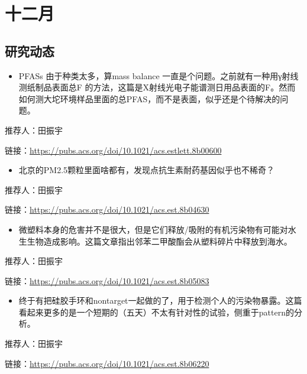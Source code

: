 \documentclass[
]{book}
\providecommand{\tightlist}{%
  \setlength{\itemsep}{0pt}\setlength{\parskip}{0pt}}
\begin{document}
\hypertarget{ux5341ux4e8cux6708-1}{%
\section*{十二月}\label{ux5341ux4e8cux6708-1}}

\hypertarget{ux7814ux7a76ux52a8ux6001-13}{%
\subsection*{研究动态}\label{ux7814ux7a76ux52a8ux6001-13}}

\begin{itemize}
\tightlist
\item
  PFASs 由于种类太多，算mass balance 一直是个问题。之前就有一种用γ射线测纸制品表面总F 的方法，这篇是X射线光电子能谱测日用品表面的F。然而如何测大坨环境样品里面的总PFAS，而不是表面，似乎还是个待解决的问题。
\end{itemize}

推荐人：田振宇

链接：\url{https://pubs.acs.org/doi/10.1021/acs.estlett.8b00600}

\begin{itemize}
\tightlist
\item
  北京的PM2.5颗粒里面啥都有，发现点抗生素耐药基因似乎也不稀奇？
\end{itemize}

推荐人：田振宇

链接：\url{https://pubs.acs.org/doi/10.1021/acs.est.8b04630}

\begin{itemize}
\tightlist
\item
  微塑料本身的危害并不是很大，但是它们释放/吸附的有机污染物有可能对水生生物造成影响。这篇文章指出邻苯二甲酸酯会从塑料碎片中释放到海水。
\end{itemize}

推荐人：田振宇

链接：\url{https://pubs.acs.org/doi/10.1021/acs.est.8b05083}

\begin{itemize}
\tightlist
\item
  终于有把硅胶手环和nontarget一起做的了，用于检测个人的污染物暴露。这篇看起来更多的是一个短期的（五天）不太有针对性的试验，侧重于pattern的分析。
\end{itemize}

推荐人：田振宇

链接：\url{https://pubs.acs.org/doi/10.1021/acs.est.8b06220}
\end{document}
